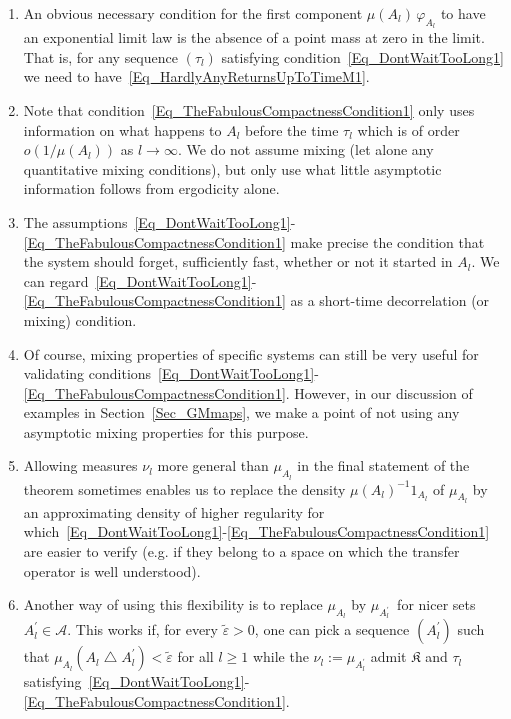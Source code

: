 \documentclass[AHL,Unicode,longabstracts]{cedram}
\newcommand{\clA}{\mathcal{A}}
\newcommand{\frkK}{\mathfrak{K}}
\newcommand*{\alphenumi}{\renewcommand*{\theenumi}{\alph{enumi}}}
\begin{document}
\begin{rema}\leavevmode
\begin{enumerate}\alphenumi
\item\label{rema3.7.a} An obvious necessary condition for the first component $\mu (A_{l})\,\varphi_{A_{l}}$ to have an exponential limit law is the absence of a point mass at zero in the limit. That is, for any sequence $(\tau_{l})$ satisfying condition~\eqref{Eq_DontWaitTooLong1} we need to have~\eqref{Eq_HardlyAnyReturnsUpToTimeM1}.
\item\label{rema3.7.b} Note that condition~\eqref{Eq_TheFabulousCompactnessCondition1} only uses information on what happens to $A_{l}$ before the time $\tau_{l}$ which is of order $o(1/\mu (A_{l}))$ as $l\rightarrow\infty$. We do not assume mixing (let alone any quantitative mixing conditions), but only use what little asymptotic information follows from ergodicity alone.
\item\label{rema3.7.c} The assumptions~\eqref{Eq_DontWaitTooLong1}-\eqref{Eq_TheFabulousCompactnessCondition1} make precise the condition that the system should forget, sufficiently fast, whether or not it started in $A_{l}$. We can regard~\eqref{Eq_DontWaitTooLong1}-\eqref{Eq_TheFabulousCompactnessCondition1} as a short-time decorrelation (or mixing) condition.
\item\label{rema3.7.d} Of course, mixing properties of specific systems can still be very useful for validating conditions~\eqref{Eq_DontWaitTooLong1}-\eqref{Eq_TheFabulousCompactnessCondition1}. However, in our discussion of examples in Section~\ref{Sec_GMmaps}, we make a point of not using any asymptotic mixing properties for this purpose.
\item\label{rema3.7.e} Allowing measures $\nu_{l}$ more general than $\mu_{A_{l} }$ in the final statement of the theorem sometimes enables us to replace the density $\mu(A_{l})^{-1}1_{A_{l}}$ of $\mu_{A_{l}}$ by an approximating density of higher regularity for which~\eqref{Eq_DontWaitTooLong1}-\eqref{Eq_TheFabulousCompactnessCondition1} are easier to verify (e.g. if they belong to a space on which the transfer operator is well understood).
\item\label{rema3.7.f} Another way of using this flexibility is to replace $\mu_{A_{l}}$ by $\mu_{A_{l}^{\prime}}$\ for nicer sets $A_{l} ^{\prime}\in\clA$. This works if, for every $\widetilde{\varepsilon} >0$, one can pick a sequence $(A_{l}^{\prime})$ such that $\mu_{A_{l}} (A_{l}\bigtriangleup A_{l}^{\prime})<\widetilde{\varepsilon}$ for all $l\geq1$ while the $\nu_{l}:=\mu_{A_{l}^{\prime}}$ admit $\frkK$ and $\tau_{l}$ satisfying~\eqref{Eq_DontWaitTooLong1}-\eqref{Eq_TheFabulousCompactnessCondition1}.
\end{enumerate}
\end{rema}
\end{document}
